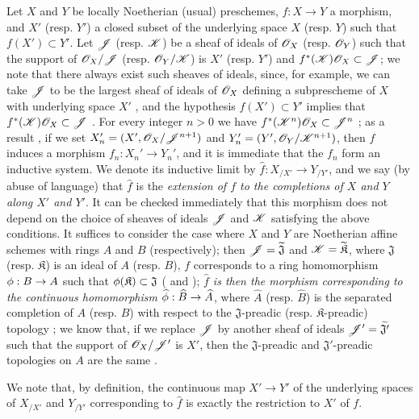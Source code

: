\begin{env}[10.9.1]
\label{1.10.9.1}
Let $X$ and $Y$ be locally Noetherian (usual) preschemes, $f:X\to Y$ a morphism, and $X'$ (resp. $Y'$) a closed subset of the underlying space $X$ (resp. $Y$) such that $f(X')\subset Y'$.
Let $\mathscr{J}$ (resp. $\mathscr{K}$) be a sheaf of ideals of $\mathscr{O}_X$ (resp. $\mathscr{O}_Y$) such that the support of $\mathscr{O}_X/\mathscr{J}$ (resp. $\mathscr{O}_Y/\mathscr{K}$) is $X'$ (resp. $Y'$) and $f^*(\mathscr{K})\mathscr{O}_X\subset\mathscr{J}$; we note that there always exist such sheaves of ideals, since, for example, we can take $\mathscr{J}$ to be the largest sheaf of ideals of $\mathscr{O}_X$ defining a subprescheme of $X$ with underlying space $X'$ , and the hypothesis $f(X')\subset Y'$ implies that $f^*(\mathscr{K})\mathscr{O}_X\subset\mathscr{J}$ .
For every integer $n>0$ we have $f^*(\mathscr{K}^n)\mathscr{O}_X\subset\mathscr{J}^n$ ; as a result , if we set $X_n'=(X',\mathscr{O}_X/\mathscr{J}^{n+1})$ and $Y_n'=(Y',\mathscr{O}_Y/\mathscr{K}^{n+1})$, then $f$ induces a morphism $f_n:X_n'\to Y_n'$, and it is immediate that the $f_n$ form an inductive system.
We denote its inductive limit  by $\widehat{f}:X_{/X'}\to Y_{/Y'}$, and we say (by abuse of language) that $\widehat{f}$ is the \emph{extension of $f$ to the completions of $X$ and $Y$ along $X'$ and $Y'$}.
It can be checked immediately that this morphism does not depend on the choice of sheaves of ideals $\mathscr{J}$ and $\mathscr{K}$ satisfying the above conditions.
It suffices to consider the case where $X$ and $Y$ are Noetherian affine schemes with rings $A$ and $B$ (respectively); then $\mathscr{J}=\widetilde{\mathfrak{J}}$ and $\mathscr{K}=\widetilde{\mathfrak{K}}$, where $\mathfrak{J}$ (resp. $\mathfrak{K}$) is an ideal of $A$ (resp. $B$), $f$ corresponds to a ring homomorphism $\vphi:B\to A$ such that $\phi(\mathfrak{K})\subset\mathfrak{J}$ ( and ); \emph{$\widehat{f}$ is then the morphism corresponding  to the continuous homomorphism $\widehat{\vphi}:\widehat{B}\to\widehat{A}$}, where $\widehat{A}$ (resp. $\widehat{B}$) is the separated completion of $A$ (resp. $B$) with respect to the $\mathfrak{J}$-preadic (resp. $\mathfrak{K}$-preadic) topology ; we know that, if we replace $\mathscr{J}$ by another
sheaf of ideals $\mathscr{J}'=\widetilde{\mathfrak{J}'}$ such that the support of $\mathscr{O}_X/\mathscr{J}'$ is $X'$, then the $\mathfrak{J}$-preadic and $\mathfrak{J}'$-preadic topologies on $A$ are the same .

We note that, by definition, the continuous map $X'\to Y'$ of the underlying spaces of $X_{/X'}$ and $Y_{/Y'}$ corresponding to $\widehat{f}$ is exactly the restriction to $X'$ of $f$.
\end{env}

